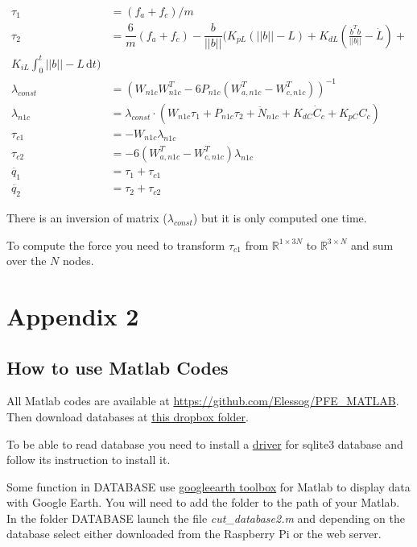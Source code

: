\documentclass[twoside,12pt]{report} %
\begin{document}
\begin{align}
\tau_1 &=  (f_a+f_c)/m\\
\tau_2 &= \dfrac{6}{m}(f_a+f_c) - \dfrac{b}{||b||}  (K_{pL} (||b|| -L) + K_{dL} (\frac{\dot{b}^Tb}{||b||} - \dot{L}) + \nonumber \\ K_{iL} \displaystyle \int_{0}^{t} ||b|| - L \, \mathrm{d}t) \\
\lambda_{const} &= (W_{n1c}W_{n1c}^T-6 P_{n1c}(W_{a,n1c}^T-W_{c,n1c}^T))^{-1} \nonumber \\
\lambda_{n1c} &=  \lambda_{const} \cdot (W_{n1c} \tau_1 + P_{n1c} \tau_2 + \ddot{N}_{n1c} +K_{dC} \dot{C}_c + K_{pC} C_c )\\
\tau_{c1} &= -W_{n1c} \lambda_{n1c} \\
\tau_{c2} &= -6(W_{a,n1c}^T-W_{c,n1c}^T) \lambda_{n1c} \\
\ddot{q_1} &= \tau_1 + \tau_{c1} \\
\ddot{q_2} &= \tau_2 + \tau_{c2}
\end{align}

There is an inversion of matrix ($\lambda_{const}$) but it is only computed one time. 

To compute the force you need to transform $\tau_{c1}$ from $\mathbb{R}^{1 \times 3N}$ to $\mathbb{R}^{3 \times N}$ and sum over the $N$ nodes.

\chapter*{Appendix 2}
\section*{How to use Matlab Codes}

All Matlab codes are available at  \href{https://github.com/Elessog/PFE\_MATLAB}{https://github.com/Elessog/PFE\_MATLAB}.\\

Then download databases at  \href{https://www.dropbox.com/sh/rxi1qrw2skyffge/AAAyLwLvpsNwcxGQiaa66Mcda?dl=0}{this dropbox folder}.

To be able to read database you need to install a \href{https://github.com/kyamagu/matlab-sqlite3-driver}{driver} for sqlite3 database and follow its instruction to install it.

Some function in DATABASE use \href{https://code.google.com/archive/p/googleearthtoolbox/}{googleearth toolbox} for Matlab to display data with Google Earth. You will need to add the folder to the path of your Matlab.\\
In the folder DATABASE launch the file \textit{cut\_database2.m} and depending on the database select either
downloaded from the Raspberry Pi or the web server. 
\end{document}
